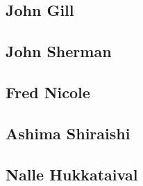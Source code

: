 \documentclass{article}
\begin{document}
\subsection{John Gill}
\label{jg}
\subsection{John Sherman}
\subsection{Fred Nicole}
\subsection{Ashima Shiraishi}
\subsection{Nalle Hukkataival}
\label{nh}
\nocite{*}
\printbibliography
\end{document}
